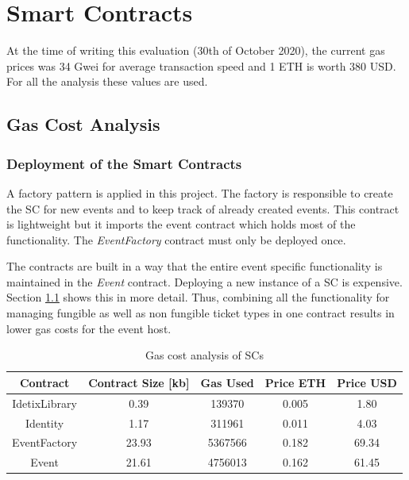 
\section{Smart Contracts}\label{sec:smart_cont:eval}

At the time of writing this evaluation (30th of October 2020), the current gas prices was 34 Gwei for average transaction speed and 1 ETH is worth 380 USD. For all the analysis these values are used.

\subsection{Gas Cost Analysis}\label{subsection:gas-cost-analysis}

\subsubsection{Deployment of the Smart Contracts}

A factory pattern is applied in this project. The factory is responsible to create the SC for new events and to keep track of already created events. This contract is lightweight but it imports the event contract which holds most of the functionality. The \textit{EventFactory} contract must only be deployed once. 

The contracts are built in a way that the entire event specific functionality is maintained in the \textit{Event} contract. Deploying a new instance of a SC is expensive. Section \ref{subsection:gas-cost-analysis} shows this in more detail. Thus, combining all the functionality for managing fungible as well as non fungible ticket types in one contract results in lower gas costs for the event host. 

\begin{table}[ht]
\centering
\begin{tabular}{|c|c|c|c|c|}
\hline
\textbf{Contract} & \textbf{Contract Size {[}kb{]}} & \textbf{Gas Used} & \textbf{Price ETH} & \textbf{Price USD} \\ \hline
IdetixLibrary     & 0.39                         & 139370            & 0.005              & 1.80               \\ \hline
Identity          & 1.17                         & 311961            & 0.011              & 4.03               \\ \hline
EventFactory      & 23.93                       & 5367566           & 0.182              & 69.34              \\ \hline
Event             & 21.61                        & 4756013           & 0.162              & 61.45              \\ \hline
\end{tabular}
\caption{Gas cost analysis of SCs}
\label{tab:gas-cost-analysis-sc}
\end{table}

